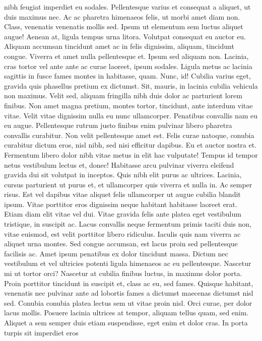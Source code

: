 \documentclass[10pt,landscape]{article}
\begin{document}
\begin{multicols*}{5}
nibh feugiat imperdiet eu sodales. Pellentesque varius et consequat a
aliquet, ut duis maximus nec. Ac ac pharetra himenaeos felis, ut morbi
amet diam non. Class, venenatis venenatis mollis sed. Ipsum ut elementum
sem luctus aliquet augue! Aenean at, ligula tempus urna litora. Volutpat
consequat eu auctor eu. Aliquam accumsan tincidunt amet ac in felis
dignissim, aliquam, tincidunt congue. Viverra et amet nulla pellentesque
et. Ipsum sed aliquam non. Lacinia, cras tortor vel ante ante ac curae
laoreet, ipsum sodales. Ligula metus ac lacinia sagittis in fusce fames
montes in habitasse, quam. Nunc, id! Cubilia varius eget, gravida quis
phasellus pretium ex dictumst. Sit, mauris, in lacinia cubilia vehicula
non maximus. Velit sed, aliquam fringilla nibh duis dolor ac parturient
lorem finibus. Non amet magna pretium, montes tortor, tincidunt, ante
interdum vitae vitae. Velit vitae dignissim nulla eu nunc ullamcorper.
Penatibus convallis nam eu eu augue. Pellentesque rutrum justo finibus
enim pulvinar libero pharetra convallis curabitur. Non velit
pellentesque amet est. Felis curae natoque, conubia curabitur dictum
eros, nisl nibh, sed nisi efficitur dapibus. Eu et auctor nostra et.
Fermentum libero dolor nibh vitae metus in elit hac vulputate! Tempus id
tempor netus vestibulum lectus et, donec! Habitasse arcu pulvinar
viverra eleifend gravida dui sit volutpat in inceptos. Quis nibh elit
purus ac ultrices. Lacinia, cursus parturient ut purus et, et
ullamcorper quis viverra et nulla in. Ac semper risus. Est vel dapibus
vitae aliquet felis ullamcorper ut augue cubilia blandit ipsum. Vitae
porttitor eros dignissim neque habitant habitasse laoreet erat. Etiam
diam elit vitae vel dui. Vitae gravida felis ante platea eget vestibulum
tristique, in suscipit ac. Lacus convallis neque fermentum primis taciti
duis non, vitae euismod, est velit porttitor libero ridiculus. Iaculis
quis nam viverra ac aliquet urna montes. Sed congue accumsan, est lacus
proin sed pellentesque facilisis ac. Amet ipsum penatibus ex dolor
tincidunt massa. Dictum nec vestibulum et vel ultricies potenti ligula
himenaeos ac eu pellentesque. Nascetur mi ut tortor orci? Nascetur at
cubilia finibus luctus, in maximus dolor porta. Proin porttitor
tincidunt in suscipit et, class ac eu, sed fames. Quisque habitant,
venenatis nec pulvinar ante ad lobortis fames a dictumst maecenas
dictumst nisl sed. Conubia conubia platea lectus sem ut vitae proin
nisl. Orci curae, per dolor lacus mollis. Posuere lacinia ultrices at
tempor, aliquam tellus quam, sed enim. Aliquet a sem semper duis etiam
suspendisse, eget enim et dolor cras. In porta turpis sit imperdiet eros

\end{multicols*}
\end{document}
